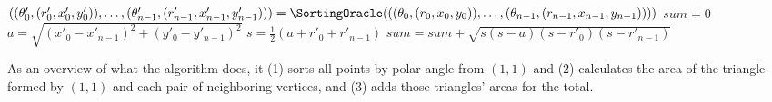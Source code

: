 \documentclass[11pt]{article}
\begin{document}
\begin{enumerate}
\begin{enumerate}
\begin{mysolution}
        \begin{algorithm}[H]
        \nonl {}\\
        $((\theta'_0,(r'_0,x'_0,y'_0)),\ldots,(\theta'_{n-1},(r'_{n-1},x'_{n-1},y'_{n-1}))) = \SortingOracle(((\theta_0,(r_0,x_0,y_0)),\ldots,(\theta_{n-1},(r_{n-1},x_{n-1},y_{n-1}))))$\;
        $\mathit{sum} = 0$\;
        $a = \sqrt{(x'_0-x'_{n-1})^2+(y'_0-y'_{n-1})^2}$\;
        $s = \frac{1}{2}(a+r'_0+r'_{n-1})$\;
        $\mathit{sum} = \mathit{sum} + \sqrt{s(s-a)(s-r'_0)(s-r'_{n-1})}$\;
        \caption{PolarSortArea}
        \end{algorithm}
        
        \qquad As an overview of what the algorithm does, it (1) sorts all points by polar angle from $(1,1)$ and (2) calculates the area of the triangle formed by $(1,1)$ and each pair of neighboring vertices, and (3) adds those triangles' areas for the total.
        
        \smallskip
        

\end{mysolution}
\end{enumerate}
\end{enumerate}
\end{document}
